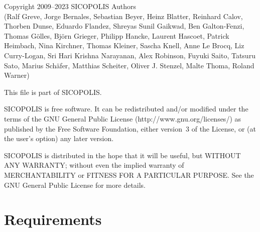 \documentclass[12pt,a4paper]{article}
\begin{document}
\begin{center}\begin{minipage}{0.85\textwidth}

\begin{small}

\noindent{}Copyright 2009--2023 SICOPOLIS Authors\\
(Ralf Greve, Jorge Bernales, Sebastian Beyer, Heinz Blatter, Reinhard Calov, Thorben Dunse, Eduardo Flandez, Shreyas Sunil Gaikwad, Ben Galton-Fenzi, Thomas G\"olles, Bj\"orn Grieger, Philipp Hancke, Laurent Hascoet, Patrick Heim\-bach, Nina Kirchner, Thomas Kleiner, Sascha Knell, Anne Le Brocq, Liz Curry-Logan, Sri Hari Krishna Narayanan, Alex Robinson, Fuyuki Saito, Tatsuru Sato, Marius Sch\"afer, Matthias Scheiter, Oliver J. Stenzel, Malte Thoma, Roland Warner)

\vspace*{1.5ex}

\noindent{}This file is part of SICOPOLIS.

\vspace*{1.5ex}

\noindent{}SICOPOLIS is free software. It can be redistributed and/or modified under the terms of the GNU General Public License (http://www.gnu.org/licenses/) as published by the Free Software Foundation, either version~3 of the License, or (at the user's option) any later version.

\vspace*{1.5ex}

\noindent{}SICOPOLIS is distributed in the hope that it will be useful, but WITHOUT ANY WARRANTY; without even the implied warranty of MERCHANTABILITY or FITNESS FOR A PARTICULAR PURPOSE.  See the GNU General Public License for more details.

\end{small}

\end{minipage}\end{center}

\vfill

\rule{0mm}{0mm}

\clearpage

\section{Requirements}
\end{document}
